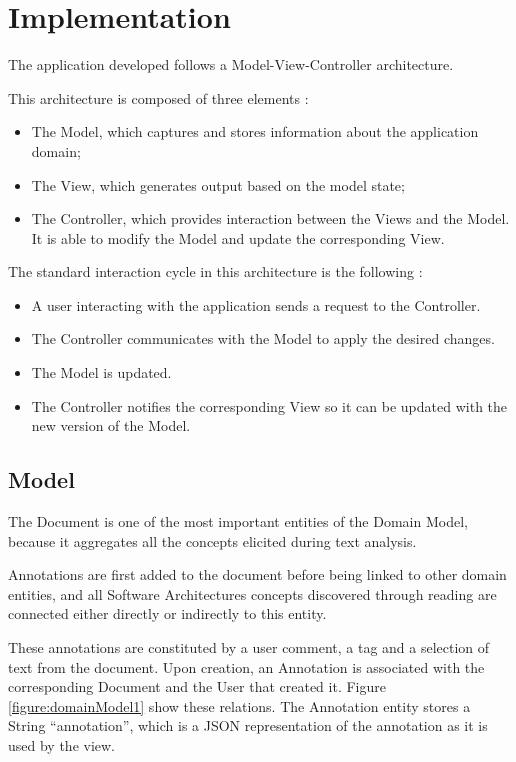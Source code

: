 
\chapter{Implementation}
\label{chapter:implementation}

The application developed follows a Model-View-Controller architecture.

This architecture is composed of three elements \cite{krasner1988description}:
\begin{itemize}
\item The Model, which captures and stores information about the application domain;
\item The View, which generates output based on the model state;
\item The Controller, which provides interaction between the Views and the Model. It is able to modify the Model and update the corresponding View.
\end{itemize}

The standard interaction cycle in this architecture is the following \cite{krasner1988description,reenskaug2009dci}:
\begin{itemize}
\item A user interacting with the application sends a request to the Controller.

\item The Controller communicates with the Model to apply the desired changes.

\item The Model is updated.

\item The Controller notifies the corresponding View so it can be updated with the new version of the Model.
\end{itemize}


\section{Model}
The Document is one of the most important entities of the Domain Model, because it aggregates all the concepts elicited during text analysis. 

Annotations are first added to the document before being linked to other domain entities, and all Software Architectures concepts discovered through reading are connected either directly or indirectly to this entity.

These annotations are constituted by a user comment, a tag and a selection of text from the document. Upon creation, an Annotation is associated with the corresponding Document and the User that created it. Figure \ref{figure:domainModel1} show these relations. The Annotation entity stores a String ``annotation'', which is a JSON representation of the annotation as it is used by the view.

